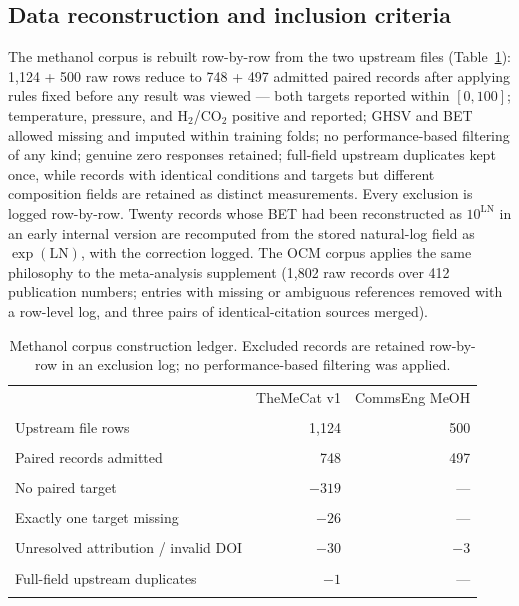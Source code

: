 \documentclass[11pt,a4paper]{article}
\begin{document}
\subsection{Data reconstruction and inclusion criteria}
The methanol corpus is rebuilt row-by-row from the two upstream files (Table~\ref{tab:ledger}):
1{,}124 + 500 raw rows reduce to 748 + 497 admitted paired records after applying rules
fixed before any result was viewed --- both targets reported within $[0,100]$; temperature,
pressure, and H$_2$/CO$_2$ positive and reported; GHSV and BET allowed missing and imputed
within training folds; no performance-based filtering of any kind; genuine zero responses
retained; full-field upstream duplicates kept once, while records with identical conditions
and targets but different composition fields are retained as distinct measurements. Every
exclusion is logged row-by-row. Twenty records whose BET had been reconstructed as
$10^{\mathrm{LN}}$ in an early internal version are recomputed from the stored natural-log
field as $\exp(\mathrm{LN})$, with the correction logged. The OCM corpus applies the same
philosophy to the meta-analysis supplement (1{,}802 raw records over 412 publication
numbers; entries with missing or ambiguous references removed with a row-level log, and
three pairs of identical-citation sources merged).

\begin{table}[t]
\centering\small
\caption{Methanol corpus construction ledger. Excluded records are retained row-by-row in
an exclusion log; no performance-based filtering was applied.}
\label{tab:ledger}
\begin{tabular}{lrr}
\toprule
 & TheMeCat v1 & CommsEng MeOH \\\\
\midrule
Upstream file rows & 1{,}124 & 500 \\\\
Paired records admitted & 748 & 497 \\\\
No paired target & $-319$ & --- \\\\
Exactly one target missing & $-26$ & --- \\\\
Unresolved attribution / invalid DOI & $-30$ & $-3$ \\\\
Full-field upstream duplicates & $-1$ & --- \\\\
\bottomrule
\end{tabular}
\end{table}
\end{document}
